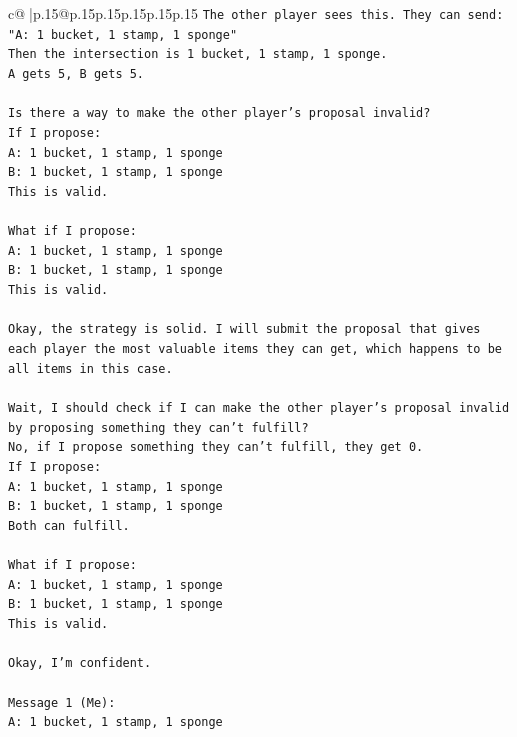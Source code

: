 \documentclass{article}
\begin{document}
{\begin{supertabular}{c@{$\;$}|p{.15\linewidth}@{}p{.15\linewidth}p{.15\linewidth}p{.15\linewidth}p{.15\linewidth}p{.15\linewidth}}
{{{\texttt{The other player sees this. They can send: "A: 1 bucket, 1 stamp, 1 sponge"} \\
\texttt{Then the intersection is 1 bucket, 1 stamp, 1 sponge.} \\
\texttt{A gets 5, B gets 5.} \\
\\ 
\texttt{Is there a way to make the other player's proposal invalid?} \\
\texttt{If I propose:} \\
\texttt{A: 1 bucket, 1 stamp, 1 sponge} \\
\texttt{B: 1 bucket, 1 stamp, 1 sponge} \\
\texttt{This is valid.} \\
\\ 
\texttt{What if I propose:} \\
\texttt{A: 1 bucket, 1 stamp, 1 sponge} \\
\texttt{B: 1 bucket, 1 stamp, 1 sponge} \\
\texttt{This is valid.} \\
\\ 
\texttt{Okay, the strategy is solid. I will submit the proposal that gives each player the most valuable items they can get, which happens to be all items in this case.} \\
\\ 
\texttt{Wait, I should check if I can make the other player's proposal invalid by proposing something they can't fulfill?} \\
\texttt{No, if I propose something they can't fulfill, they get 0.} \\
\texttt{If I propose:} \\
\texttt{A: 1 bucket, 1 stamp, 1 sponge} \\
\texttt{B: 1 bucket, 1 stamp, 1 sponge} \\
\texttt{Both can fulfill.} \\
\\ 
\texttt{What if I propose:} \\
\texttt{A: 1 bucket, 1 stamp, 1 sponge} \\
\texttt{B: 1 bucket, 1 stamp, 1 sponge} \\
\texttt{This is valid.} \\
\\ 
\texttt{Okay, I'm confident.} \\
\\ 
\texttt{Message 1 (Me):} \\
\texttt{A: 1 bucket, 1 stamp, 1 sponge} \\
}}}
\end{supertabular}}
\end{document}
